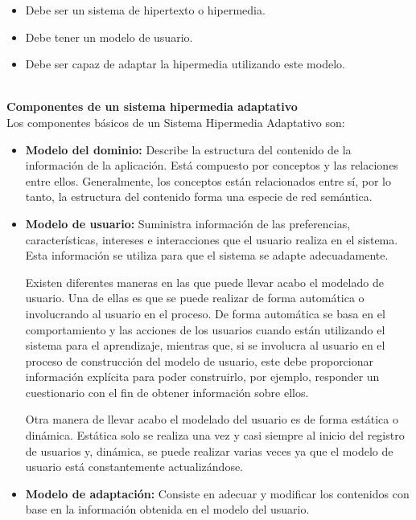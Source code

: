 \begin{itemize}
     \item Debe ser un sistema de hipertexto o hipermedia.
     
     \item Debe tener un modelo de usuario.
     
     \item Debe ser capaz de adaptar la hipermedia utilizando este modelo.
\end{itemize}
\ \\
\textbf{Componentes de un sistema hipermedia adaptativo} \cite{Graf2007}\ \\
Los componentes básicos de un Sistema Hipermedia Adaptativo son:
\ \\
\begin{itemize}
    \item \textbf{Modelo del dominio:} Describe la estructura del contenido de la información de la aplicación. Está compuesto por conceptos y las relaciones entre ellos. Generalmente, los conceptos están relacionados entre sí, por lo tanto, la estructura del contenido forma una especie de red semántica.
    
    \item \textbf{Modelo de usuario:} Suministra información de las preferencias, características, intereses e interacciones que el usuario realiza en el sistema. Esta información se utiliza para que el sistema se adapte adecuadamente. 

    Existen diferentes maneras en las que puede llevar acabo el modelado de usuario. Una de ellas es que se puede realizar de forma automática o involucrando al usuario en el proceso. De forma automática se basa en el comportamiento y las acciones de los usuarios cuando están utilizando el sistema para el aprendizaje, mientras que, si se involucra al usuario en el proceso de construcción del modelo de usuario, este debe proporcionar información explícita para poder construirlo, por ejemplo, responder un cuestionario con el fin de obtener información sobre ellos.
    
    Otra manera de llevar acabo el modelado del usuario es de forma estática o dinámica. Estática solo se realiza una vez y casi siempre al inicio del registro de usuarios y, dinámica, se puede realizar varias veces ya que el modelo de usuario está constantemente actualizándose.
    
    \item \textbf{Modelo de adaptación:} Consiste en adecuar y modificar los contenidos con base en la información obtenida en el modelo del usuario.

\end{itemize}

